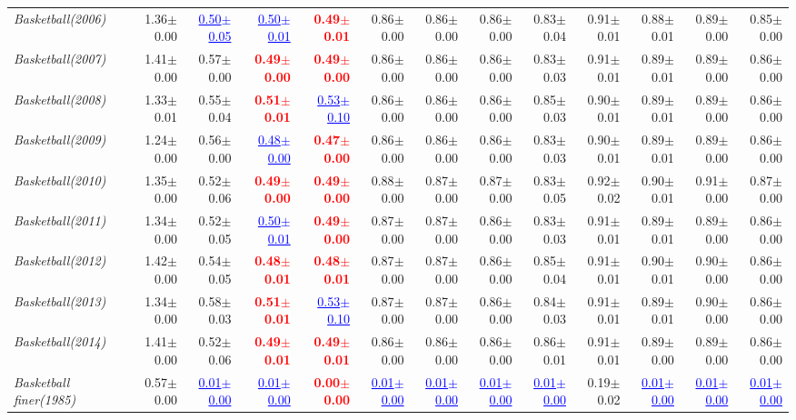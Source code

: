 \documentclass[nohyperref]{article}
\theoremstyle{plain}
\theoremstyle{definition}
\theoremstyle{remark}
\newcommand{\red}[1]{\textcolor{red}{\textbf{#1}}}
\newcommand{\blue}[1]{\textcolor{blue}{\underline{#1}}}
\begin{document}
\begin{table*}[!ht]
{\begin{tabular}{lrr|rrrrr|rrrrr}
			{\it Basketball(2006)} & 1.36$\pm$0.00 & \blue{0.50$\pm$0.05} & \blue{0.50$\pm$0.01} & \red{0.49$\pm$0.01} & 0.86$\pm$0.00 & 0.86$\pm$0.00 & 0.86$\pm$0.00 & 0.83$\pm$0.04 & 0.91$\pm$0.01 & 0.88$\pm$0.01 & 0.89$\pm$0.00 & 0.85$\pm$0.00 \\
			{\it Basketball(2007)} & 1.41$\pm$0.00 & 0.57$\pm$0.00 & \red{0.49$\pm$0.00} & \red{0.49$\pm$0.00} & 0.86$\pm$0.00 & 0.86$\pm$0.00 & 0.86$\pm$0.00 & 0.83$\pm$0.03 & 0.91$\pm$0.01 & 0.89$\pm$0.01 & 0.89$\pm$0.00 & 0.86$\pm$0.00 \\
			{\it Basketball(2008)} & 1.33$\pm$0.01 & 0.55$\pm$0.04 & \red{0.51$\pm$0.01} & \blue{0.53$\pm$0.10} & 0.86$\pm$0.00 & 0.86$\pm$0.00 & 0.86$\pm$0.00 & 0.85$\pm$0.03 & 0.90$\pm$0.01 & 0.89$\pm$0.01 & 0.89$\pm$0.00 & 0.86$\pm$0.00 \\
			{\it Basketball(2009)} & 1.24$\pm$0.00 & 0.56$\pm$0.00 & \blue{0.48$\pm$0.00} & \red{0.47$\pm$0.00} & 0.86$\pm$0.00 & 0.86$\pm$0.00 & 0.86$\pm$0.00 & 0.83$\pm$0.03 & 0.90$\pm$0.01 & 0.89$\pm$0.01 & 0.89$\pm$0.00 & 0.86$\pm$0.00 \\
			{\it Basketball(2010)} & 1.35$\pm$0.00 & 0.52$\pm$0.06 & \red{0.49$\pm$0.00} & \red{0.49$\pm$0.00} & 0.88$\pm$0.00 & 0.87$\pm$0.00 & 0.87$\pm$0.00 & 0.83$\pm$0.05 & 0.92$\pm$0.02 & 0.90$\pm$0.01 & 0.91$\pm$0.00 & 0.87$\pm$0.00 \\
			{\it Basketball(2011)} & 1.34$\pm$0.00 & 0.52$\pm$0.05 & \blue{0.50$\pm$0.01} & \red{0.49$\pm$0.00} & 0.87$\pm$0.00 & 0.87$\pm$0.00 & 0.86$\pm$0.00 & 0.83$\pm$0.03 & 0.91$\pm$0.01 & 0.89$\pm$0.01 & 0.89$\pm$0.00 & 0.86$\pm$0.00 \\
			{\it Basketball(2012)} & 1.42$\pm$0.00 & 0.54$\pm$0.05 & \red{0.48$\pm$0.01} & \red{0.48$\pm$0.01} & 0.87$\pm$0.00 & 0.87$\pm$0.00 & 0.86$\pm$0.00 & 0.85$\pm$0.04 & 0.91$\pm$0.01 & 0.90$\pm$0.01 & 0.90$\pm$0.00 & 0.86$\pm$0.00 \\
			{\it Basketball(2013)} & 1.34$\pm$0.00 & 0.58$\pm$0.03 & \red{0.51$\pm$0.01} & \blue{0.53$\pm$0.10} & 0.87$\pm$0.00 & 0.87$\pm$0.00 & 0.86$\pm$0.00 & 0.84$\pm$0.03 & 0.91$\pm$0.01 & 0.89$\pm$0.01 & 0.90$\pm$0.00 & 0.86$\pm$0.00 \\
			{\it Basketball(2014)} & 1.41$\pm$0.00 & 0.52$\pm$0.06 & \red{0.49$\pm$0.01} & \red{0.49$\pm$0.01} & 0.86$\pm$0.00 & 0.86$\pm$0.00 & 0.86$\pm$0.00 & 0.86$\pm$0.01 & 0.91$\pm$0.01 & 0.89$\pm$0.00 & 0.89$\pm$0.00 & 0.86$\pm$0.00 \\
			{\it Basketball finer(1985)} & 0.57$\pm$0.00 & \blue{0.01$\pm$0.00} & \blue{0.01$\pm$0.00} & \red{0.00$\pm$0.00} & \blue{0.01$\pm$0.00} & \blue{0.01$\pm$0.00} & \blue{0.01$\pm$0.00} & \blue{0.01$\pm$0.00} & 0.19$\pm$0.02 & \blue{0.01$\pm$0.00} & \blue{0.01$\pm$0.00} & \blue{0.01$\pm$0.00} \\

\end{tabular}}
\end{table*}
\end{document}
